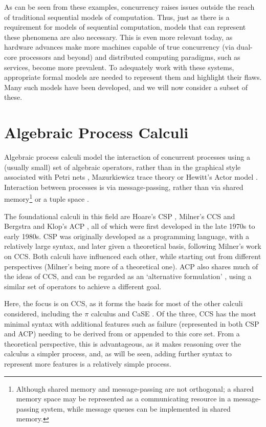 As can be seen from these examples, concurrency raises issues outside
the reach of traditional sequential models of computation.  Thus, just
as there is a requirement for models of sequential computation, models
that can represent these phenomena are also necessary.  This is even
more relevant today, as hardware advances make more machines capable
of true concurrency (via dual-core processors and beyond) and
distributed computing paradigms, such as services, become more
prevalent.  To adequately work with these systems, appropriate formal
models are needed to represent them and highlight their flaws.  Many
such models have been developed, and we will now consider a subset of
these.

\section{Algebraic Process Calculi}

Algebraic process calculi model the interaction of concurrent processes
using a (usually small) set of algebraic operators, rather than in the
graphical style associated with Petri nets \cite{petri:phd},
Mazurkiewicz trace theory \cite{maz:trace} or Hewitt's Actor model
\cite{hewitt:actor}.  Interaction between processes is via
message-passing, rather than via shared memory\footnote{Although shared
memory and message-passing are not orthogonal; a shared memory space may
be represented as a communicating resource in a message-passing system,
while message queues can be implemented in shared memory.} or a tuple
space \cite{linda}.

The foundational calculi in this field are Hoare's CSP \cite{hoare:csp78},
Milner's CCS \cite{milner:ccs} and Bergstra and Klop's ACP \cite{acp}, all of
which were first developed in the late 1970s to early 1980s.  CSP was
originally developed as a programming language, with a relatively large
syntax, and later given a theoretical basis, following Milner's work on
CCS.  Both calculi have influenced each other, while starting out from
different perspectives (Milner's being more of a theoretical one).  ACP
also shares much of the ideas of CCS, and can be regarded as an
`alternative formulation' \cite{acp}, using a similar set of operators
to achieve a different goal.

Here, the focus is on CCS, as it forms the basis for most of the other
calculi considered, including the $\pi$ calculus
\cite{picalctutorial} and CaSE \cite{CaSE}.  Of the three, CCS has the
most minimal syntax with additional features such as failure
(represented in both CSP and ACP) needing to be derived from or appended to
this core set.  From a theoretical perspective, this is advantageous, as
it makes reasoning over the calculus a simpler process, and, as will be
seen, adding further syntax to represent more features is a relatively
simple process.

